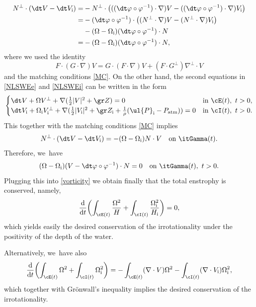\begin{align*}
N^\perp\cdot(\dt V - \dt V_\mathrm{i})
=& -N^\perp\cdot\bigl(((\dt\varphi \circ \varphi^{-1})\cdot\nabla)V
- ((\dt\varphi \circ \varphi^{-1})\cdot\nabla)V_\mathrm{i} \bigr) \\
=& -(\dt\varphi \circ \varphi^{-1})\cdot\bigl((N^\perp\cdot\nabla)V - (N^\perp\cdot\nabla)V_\mathrm{i} \bigr)\\
& - (\Omega - \Omega_\mathrm{i})(\dt\varphi \circ \varphi^{-1}) \cdot N \\
=& - (\Omega - \Omega_\mathrm{i})(\dt\varphi \circ \varphi^{-1}) \cdot N,
\end{align*}
where we used the identity
\begin{equation}\label{F1}
F \cdot (G\cdot\nabla)V = G \cdot (F\cdot\nabla)V + (F\cdot G^\perp)\nabla^\perp \cdot V
\end{equation}
and the matching conditions \eqref{MC}.
On the other hand, the second equations in \eqref{NLSWEe} and \eqref{NLSWEi} can be written in the form
\[
\begin{cases}
\dt V + \Omega V^\perp + \nabla(\frac12|V|^2 + \gr Z) = 0 & \text{in } \cE(t), \ t>0, \\
\dt V_\mathrm{i} + \Omega_\mathrm{i} V_\mathrm{i}^\perp
+ \nabla(\frac12|V_\mathrm{i}|^2 + \gr Z_\mathrm{i} + \frac{1}{\rho}(\ul{P}_\mathrm{i}-P_\mathrm{atm})) = 0 & \text{in } \cI(t), \ t>0.
\end{cases}
\]
This together with the matching conditions \eqref{MC} implies
\[
N^\perp\cdot(\dt V - \dt V_\mathrm{i})=-(\Omega-\Omega_\mathrm{i})N\cdot V\quad\text{on }\itGamma(t).
\]
Therefore, we~have
\[
(\Omega - \Omega_\mathrm{i})(V - \dt\varphi \circ \varphi^{-1})\cdot N = 0 \quad\text{on } \itGamma(t), \ t>0.
\]
Plugging this into \eqref{vorticity} we obtain finally that the total enstrophy is conserved, namely,
\[
\frac{\rm d}{{\rm d}t}\biggl(\int_{\cE(t)}\frac{\Omega^2}{H} + \int_{\cI(t)}\frac{\Omega_\mathrm{i}^2}{H_\mathrm{i}} \biggr) = 0,
\]
which yields easily the desired conservation of the irrotationality under the positivity of the depth of the water.

Alternatively, we~have also
\[
\frac{\rm d}{{\rm d}t}\biggl(\int_{\cE(t)}\Omega^2 + \int_{\cI(t)}\Omega_\mathrm{i}^2\biggr)
= - \int_{\cE(t)}(\nabla\cdot V)\Omega^2 - \int_{\cI(t)}(\nabla\cdot V_\mathrm{i})\Omega_\mathrm{i}^2,
\]
which together with Grönwall's inequality implies the desired conservation of the irrotationality.

